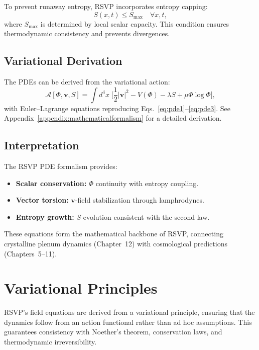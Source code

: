 \documentclass[12pt]{report}
\begin{document}
To prevent runaway entropy, RSVP incorporates entropy capping:
\begin{equation}
S(x,t) \leq S_{\text{max}} \quad \forall x,t,
\end{equation}
where $S_{\text{max}}$ is determined by local scalar capacity. This condition ensures thermodynamic consistency and prevents divergences.

\section{Variational Derivation}

The PDEs can be derived from the variational action:
\begin{equation}
\mathcal{A}[\Phi,\mathbf{v},S] = \int d^4x \;
\Bigg[\frac{1}{2}|\mathbf{v}|^2 - V(\Phi) - \lambda S + \mu \Phi \log \Phi \Bigg],
\end{equation}
with Euler–Lagrange equations reproducing Eqs.~\eqref{eq:pde1}--\eqref{eq:pde3}.  
See Appendix~\ref{appendix:mathematicalformalism} for a detailed derivation.

\section{Interpretation}

The RSVP PDE formalism provides:

\begin{itemize}
    \item \textbf{Scalar conservation:} $\Phi$ continuity with entropy coupling.  
    \item \textbf{Vector torsion:} $\mathbf{v}$-field stabilization through lamphrodynes.  
    \item \textbf{Entropy growth:} $S$ evolution consistent with the second law.  
\end{itemize}

These equations form the mathematical backbone of RSVP, connecting crystalline plenum dynamics (Chapter~12) with cosmological predictions (Chapters~5--11).
\chapter{Variational Principles}

RSVP’s field equations are derived from a variational principle, ensuring that the dynamics follow from an action functional rather than ad hoc assumptions. This guarantees consistency with Noether’s theorem, conservation laws, and thermodynamic irreversibility.
\end{document}
